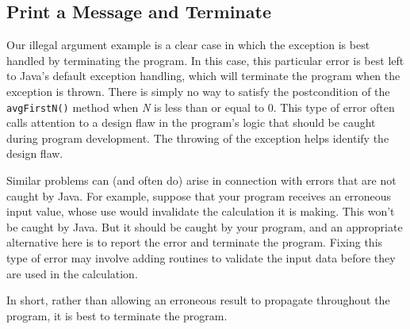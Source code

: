 
\subsection{Print a Message and Terminate}
\noindent Our illegal argument example is a clear case in which the
exception is best handled by terminating the program.  In this case,
this particular error is best left to Java's default exception
handling, which will terminate the program when the exception is
thrown.  There is simply no way to satisfy the postcondition of the
{\tt avgFirstN()} method when {\it N} is less than or equal to 0.
This type of error often calls attention to a design flaw in the
program's logic that should be caught during program development.  The
throwing of the exception helps identify the design flaw.



\noindent Similar problems can (and often do) arise in connection with
errors that are not caught by Java.  For example, suppose that your
program receives an erroneous input value, whose use would invalidate
the calculation it is making.  This won't be caught by Java.  But it
should
be caught by your program, and an appropriate alternative here is to
report the error and terminate the program.   Fixing this type of
error may involve adding routines to validate the input data
before they are used in the calculation.

In short, rather than allowing an erroneous result to propagate
throughout the program, it is best to terminate the program.


